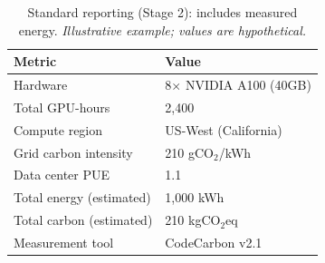 \documentclass{article}
\theoremstyle{plain}
\theoremstyle{definition}
\theoremstyle{remark}
\begin{document}
\begin{table}[!ht]
\caption{Standard reporting (Stage 2): includes measured energy. \textit{Illustrative example; values are hypothetical.}}
\label{tab:report-card}
\begin{center}
\begin{tabular}{p{5cm}p{10cm}}
\toprule
\textbf{Metric} & \textbf{Value} \\
\midrule
Hardware & 8$\times$ NVIDIA A100 (40GB) \\
Total GPU-hours & 2,400 \\
Compute region & US-West (California) \\
Grid carbon intensity & 210 gCO$_2$/kWh \\
Data center PUE & 1.1 \\
\midrule
Total energy (estimated) & 1,000 kWh \\
Total carbon (estimated) & 210 kgCO$_2$eq \\
\midrule
Measurement tool & CodeCarbon v2.1 \\
\bottomrule
\end{tabular}
\end{center}
\end{table}
\end{document}
